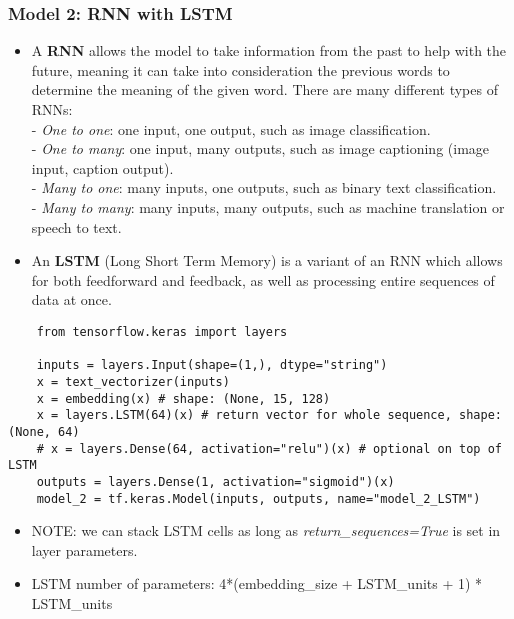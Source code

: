 \documentclass[11pt, a4paper]{article}
\begin{document}
	\subsubsection{Model 2: RNN with LSTM}
	\begin{itemize}
		\item A \textbf{RNN} allows the model to take information from the past to help with the future, meaning it can take into consideration the previous words to determine the meaning of the given word. There are many different types of RNNs:\\
		- \textit{One to one}: one input, one output, such as image classification.\\
		- \textit{One to many}: one input, many outputs, such as image captioning (image input, caption output).\\
		- \textit{Many to one}: many inputs, one outputs, such as binary text classification.\\
		- \textit{Many to many}: many inputs, many outputs, such as machine translation or speech to text.
		\item An \textbf{LSTM} (Long Short Term Memory) is a variant of an RNN which allows for both feedforward and feedback, as well as processing entire sequences of data at once.
	\end{itemize} \newpage


	\begin{lstlisting}
	from tensorflow.keras import layers
	
	inputs = layers.Input(shape=(1,), dtype="string")
	x = text_vectorizer(inputs)
	x = embedding(x) # shape: (None, 15, 128)
	x = layers.LSTM(64)(x) # return vector for whole sequence, shape: (None, 64)
	# x = layers.Dense(64, activation="relu")(x) # optional on top of LSTM
	outputs = layers.Dense(1, activation="sigmoid")(x)
	model_2 = tf.keras.Model(inputs, outputs, name="model_2_LSTM") \end{lstlisting}
	\begin{itemize}
		\item NOTE: we can stack LSTM cells as long as \textit{return\_sequences=True} is set in layer parameters.
		\item LSTM number of parameters: 4*(embedding\_size + LSTM\_units + 1) * LSTM\_units 
	\end{itemize}
\end{document}
